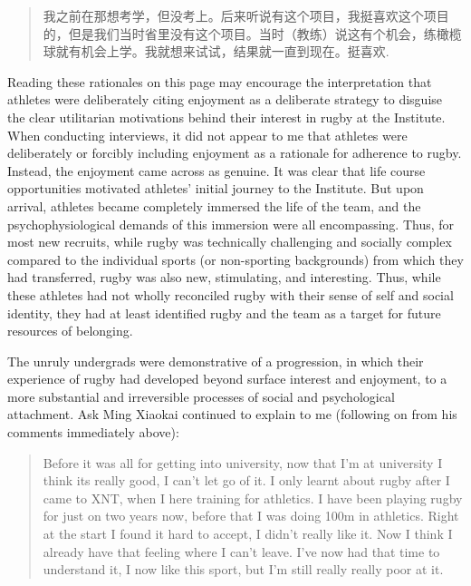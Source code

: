 \begin{CJK}{UTF8}{gbsn}
    \begin{quote}
        我之前在那想考学，但没考上。后来听说有这个项目，我挺喜欢这个项目的，但是我们当时省里没有这个项目。当时（教练）说这有个机会，练橄榄球就有机会上学。我就想来试试，结果就一直到现在。挺喜欢.
    \end{quote}

Reading these rationales on this page may encourage the interpretation that athletes were deliberately citing enjoyment as a deliberate strategy to disguise the clear utilitarian motivations behind their interest in rugby at the Institute.  When conducting interviews, it did not appear to me that athletes were deliberately or forcibly including enjoyment as a rationale for adherence to rugby.  Instead, the enjoyment came across as genuine.  It was clear that life course opportunities motivated athletes' initial journey to the Institute.  But upon arrival, athletes became completely immersed the life of the team, and the psychophysiological demands of this immersion were all encompassing.  Thus, for most new recruits, while rugby was technically challenging and socially complex compared to the individual sports (or non-sporting backgrounds) from which they had transferred, rugby was also new, stimulating, and interesting.  Thus, while these athletes had not wholly reconciled rugby with their sense of self and social identity, they had at least identified rugby and the team as a target for future resources of belonging.



The unruly undergrads were demonstrative of a progression, in which their experience of rugby had developed beyond surface interest and enjoyment, to a more substantial and irreversible processes of social and psychological attachment.  Ask Ming Xiaokai continued to explain to me (following on from his comments immediately above):

\begin{quote}
    Before it was all for getting into university, now that I'm at university I think its really good, I can't let go of it.
    I only learnt about rugby after I came to XNT, when I here training for athletics.  I have been playing rugby for just on two years now, before that I was doing 100m in athletics.  Right at the start I found it hard to accept, I didn’t really like it. Now I think I already have that feeling where I can’t leave.  I’ve now had that time to understand it, I now like this sport, but I’m still really really poor at it.
\end{quote}


\end{CJK}
